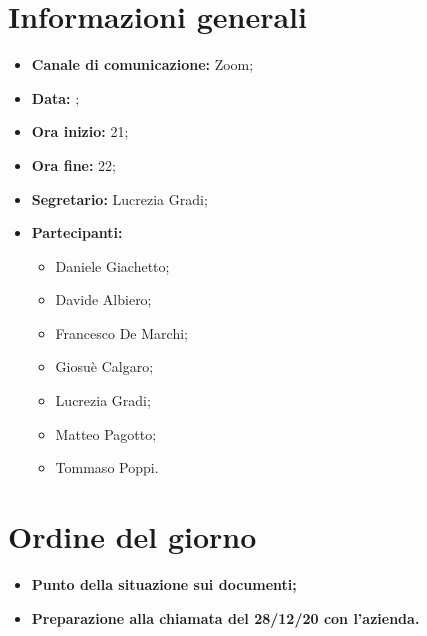 \section{Informazioni generali}

\begin{itemize}

	\item \textbf{Canale di comunicazione:} Zoom;
	
	\item \textbf{Data:} \DataMeeting{};
	
	\item \textbf{Ora inizio:} 21;
	
	\item \textbf{Ora fine:} 22;
	
	\item \textbf{Segretario:} Lucrezia Gradi;
	
	\item \textbf{Partecipanti:}
	
		\begin{itemize}
		
			\item Daniele Giachetto;
			\item Davide Albiero;
			\item Francesco De Marchi;
			\item Giosuè Calgaro;
			\item Lucrezia Gradi;
			\item Matteo Pagotto;
			\item Tommaso Poppi.
				 
		\end{itemize}

\end{itemize}

\section{Ordine del giorno}

\begin{itemize}

	\item\textbf{Punto della situazione sui documenti;}
	
	\item\textbf{Preparazione alla chiamata del 28/12/20 con l'azienda.}

\end{itemize}

\newpage


